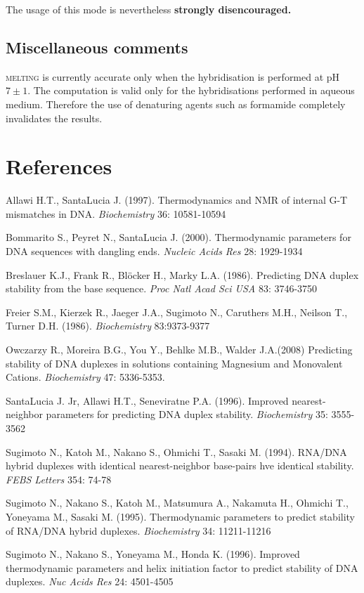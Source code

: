 \documentclass{article}
\begin{document}
  The usage of this mode is nevertheless  \textbf{strongly disencouraged.}   
   
\subsection{Miscellaneous comments }  
\textsc{melting} is currently accurate only when the hybridisation is performed
at pH $7\pm 1$.  The computation is valid only for the hybridisations performed
in aqueous medium. Therefore the use of denaturing agents such as formamide
completely invalidates the results.
   
\section{References }
Allawi 
H.T., SantaLucia J. (1997). Thermodynamics and NMR of internal G-T mismatches 
in DNA. \textit{Biochemistry}  36: 10581-10594   

Bommarito S., Peyret N., SantaLucia J. (2000).  Thermodynamic parameters for DNA
sequences with dangling ends.  \textit{Nucleic Acids Res} 28: 1929-1934

  Breslauer K.J., Frank R., Bl\"ocker 
H., Marky L.A. (1986). Predicting DNA duplex stability from the base sequence. 
 \textit{Proc Natl Acad Sci USA}  83: 3746-3750   

  Freier S.M., Kierzek R., Jaeger 
J.A., Sugimoto N., Caruthers M.H., Neilson T., Turner D.H. (1986). \textit{Biochemistry} 
 83:9373-9377 
 
 Owczarzy R., Moreira B.G., You Y., Behlke M.B., Walder J.A.(2008) Predicting stability of DNA duplexes 
 in solutions containing Magnesium and Monovalent Cations. \textit{Biochemistry} 47: 5336-5353.  

  SantaLucia J. Jr, Allawi H.T., Seneviratne P.A. (1996). Improved 
nearest-neighbor parameters for predicting DNA duplex stability. \textit{Biochemistry} 
35: 3555-3562   

  Sugimoto N., Katoh M., Nakano S., Ohmichi T., Sasaki M. (1994). 
RNA/DNA hybrid duplexes with identical nearest-neighbor base-pairs hve identical 
stability. \textit{FEBS Letters} 354: 74-78   

  Sugimoto N., Nakano S., Katoh M., Matsumura 
A., Nakamuta H., Ohmichi T., Yoneyama M., Sasaki M. (1995). Thermodynamic parameters 
to predict stability of RNA/DNA hybrid duplexes. \textit{Biochemistry} 34: 11211-11216 
  
  Sugimoto N., Nakano S., Yoneyama M., Honda K. (1996).  Improved thermodynamic 
parameters and helix initiation factor to predict stability of DNA duplexes. 
\textit{Nuc Acids Res}  24: 4501-4505  
\end{document}
